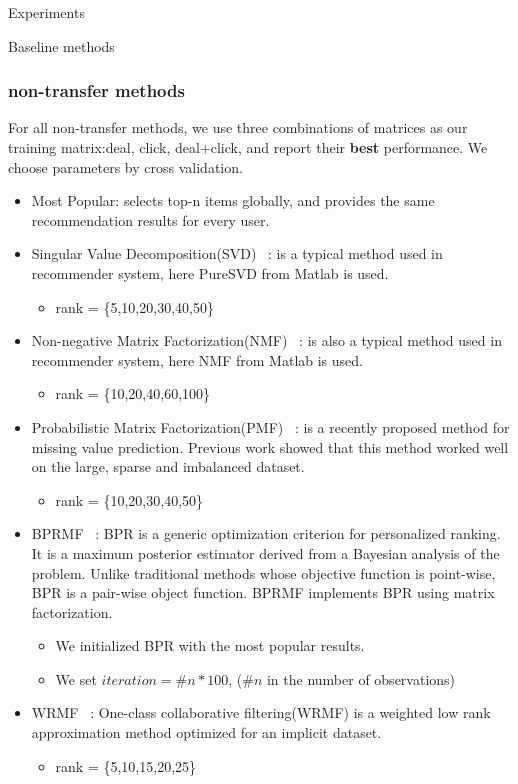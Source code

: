 \begin{section}{Experiments}
\begin{subsection}{Baseline methods}
\subsubsection{non-transfer methods}
\par{
  For all non-transfer methods, we use three combinations of matrices as our training matrix:{deal, click, deal+click}, and report their \textbf{best} performance. We choose parameters by cross validation.
  \begin{itemize}
    \item Most Popular: selects top-n items globally, and provides the same recommendation results for every user.
    \item Singular Value Decomposition(SVD) ~\cite{paterek07}:  is a typical method used in recommender system, here PureSVD from Matlab is used.
      \begin{itemize}
      \item rank = \{5,10,20,30,40,50\}
      \end{itemize}
    \item Non-negative Matrix Factorization(NMF)  ~\cite{/computer/yehuda09matrix}: is also a typical method used in recommender system, here NMF from Matlab is used.
      \begin{itemize}
      \item rank = \{10,20,40,60,100\}
      \end{itemize}
    \item Probabilistic Matrix Factorization(PMF) ~\cite{/nips/SalMnih08}: is a recently proposed method for missing value prediction. Previous work showed that this method worked well on the large, sparse and imbalanced dataset.
      \begin{itemize}
      \item rank = \{10,20,30,40,50\}
      \end{itemize}
    \item BPRMF ~\cite{Rendle:2009:BBP:1795114.1795167}: BPR is a generic optimization criterion for personalized ranking. It is a maximum posterior estimator derived from a Bayesian analysis of the problem. Unlike traditional methods whose objective function is point-wise, BPR is a pair-wise object function. BPRMF implements BPR using matrix factorization.
      \begin{itemize}
      \item We initialized BPR with the most popular results.
      \item We set $iteration = \#n * 100$, ($\#n$ in the number of observations)
      \end{itemize}
    \item WRMF ~\cite{4781145}: One-class collaborative filtering(WRMF) is a weighted low rank approximation method optimized for an implicit dataset. 
      \begin{itemize}
      \item rank = \{5,10,15,20,25\}
    \end{itemize}
\end{itemize}
}
\end{subsection}
\end{section}
